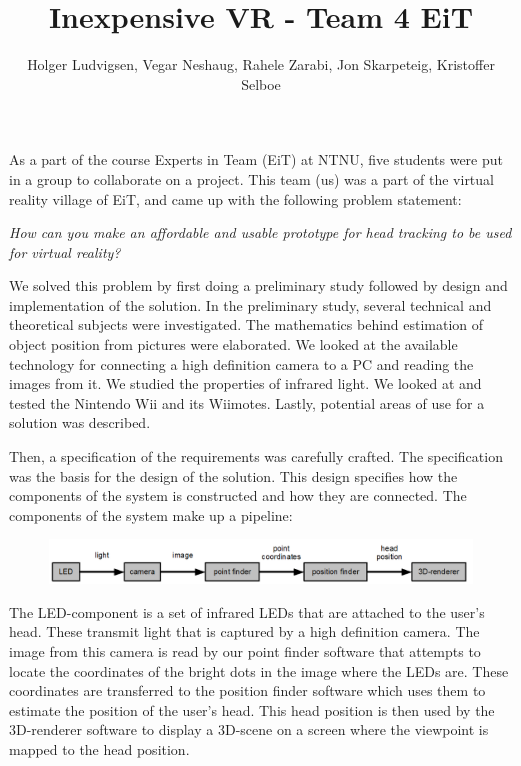 \documentclass[10pt, twocolumn]{article}
\title{Inexpensive VR - Team 4 EiT}
\author{Holger Ludvigsen, Vegar Neshaug, Rahele Zarabi, Jon Skarpeteig, Kristoffer Selboe}
\date{}
\begin{document}
\maketitle

As a part of the course Experts in Team (EiT) at NTNU, five students were put in a group to collaborate on a project. This team (us) was a part of the virtual reality village of EiT, and came up with the following problem statement:

\setlength{\parskip}{0.0in}
\begin{center}
	\em How can you make an affordable and usable prototype for head tracking to be used for virtual reality?
\end{center}

We solved this problem by first doing a preliminary study followed by design and implementation of the solution. In the preliminary study, several technical and theoretical subjects were investigated. The mathematics behind estimation of object position from pictures were elaborated. We looked at the available technology for connecting a high definition camera to a PC and reading the images from it. We studied the properties of infrared light. We looked at and tested the Nintendo Wii and its Wiimotes. Lastly, potential areas of use for a solution was described.

\setlength{\parskip}{0.1in}

Then, a specification of the requirements was carefully crafted. The specification was the basis for the design of the solution. This design specifies how the components of the system is constructed and how they are connected. The components of the system make up a pipeline:

\begin{figure}[h]
\centering
\includegraphics[width=\textwidth]{graphics/main_design_english.png}
\end{figure}

The LED-component is a set of infrared LEDs that are attached to the user's head. These transmit light that is captured by a high definition camera. The image from this camera is read by our point finder software that attempts to locate the coordinates of the bright dots in the image where the LEDs are. These coordinates are transferred to the position finder software which uses them to estimate the position of the user's head. This head position is then used by the 3D-renderer software to display a 3D-scene on a screen where the viewpoint is mapped to the head position.
\end{document}
